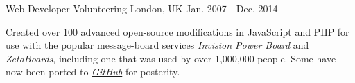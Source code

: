 \begin{cventries}
  \cventry
    {} %
    {Web Developer} %
    {Volunteering} %
    {London, UK} %
    {Jan. 2007 - Dec. 2014} %
    {
      \begin{cvitems} %
        \item {Created over 100 advanced open-source modifications in JavaScript and PHP for use with the popular message-board services \textit{Invision Power Board} and \textit{ZetaBoards}, including one that was used by over 1,000,000 people. Some have now been ported to \href{https://github.com/KeirSimmons/ZetaBoards}{\emph{GitHub}} for posterity.}
      \end{cvitems}
    }



\end{cventries}